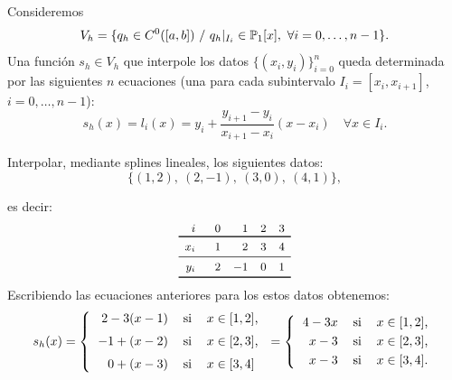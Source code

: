     Consideremos
    \begin{equation*}
      V_h = \{q_h \in C^{0}([a,b])\ / \ q_h|_{I_i}\in  \operatorname{{\mathbb P}}_1[x],\ \forall i=0,\dots,n-1\}.
    \end{equation*}
    Una función $s_h\in V_h$ que interpole los datos
    $\{(x_i,y_i)\}_{i=0}^n$ queda determinada por las siguientes $n$
    ecuaciones (una para cada subintervalo $I_i=[x_i, x_{i+1}]$,
    $i=0,\dots,n-1$):
    \begin{equation*}
      \label{eq:splines-lineales-1}
      s_h(x) = l_i(x) = y_i + \frac{y_{i+1}-y_i}{x_{i+1}-x_i}(x-x_i) \quad
      \forall x\in I_i.
    \end{equation*}

    \begin{example}
      \label{ex:splines-lineales-1}
      Interpolar, mediante splines lineales, los siguientes
      datos:
      \begin{equation*}
        \{ (1,2),\ (2,-1),\ (3,0),\ (4,1) \},
      \end{equation*}
    \end{example}
    es decir:
    \begin{equation*}
      \small
      \begin{array}{r@{\rule{4ex}{0pt}}rrrcr}
        i & 0 & 1 & 2 & 3 
        \\ \toprule %
        x_i & 1 & 2 & 3 & 4
        \\ \midrule
        y_i & 2 & -1 & 0  & 1
        \\
        \bottomrule
      \end{array}
      \label{eq:tabla-datos-lagrange}
    \end{equation*}
    Escribiendo las ecuaciones anteriores para los
    estos datos obtenemos:
    \begin{equation*}
      s_h(x)=\left\{
        \begin{tabular}{rll}
          $2 -3 (x-1)$ & si & $x\in[1,2]$,
          \\\noalign{\medskip}
          $-1 + (x-2)$ & si & $x\in[2,3]$,
          \\\noalign{\medskip}
          $0 + (x-3)$ & si & $x\in[3,4]$
        \end{tabular} \right.
      =\left\{
        \begin{tabular}{rll}
          $4 -3x$ & si & $x\in[1,2]$,
          \\\noalign{\smallskip}
          $x-3$ & si & $x\in[2,3]$,
          \\\noalign{\smallskip}
          $x-3$ & si & $x\in[3,4]$.
        \end{tabular} \right.
    \end{equation*}

